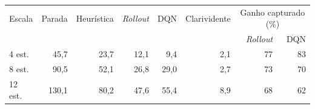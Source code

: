 \begin{tabular}{lrrrrrrr}
\toprule
Escala & Parada & Heur\'istica & \emph{Rollout} & DQN & Clarividente & \multicolumn{2}{c}{Ganho capturado (\%)} \\
\cmidrule(lr){7-8}
 & & & & & & \emph{Rollout} & DQN \\
\midrule
4 est. & 45,7 & 23,7 & 12,1 & 9,4 & 2,1 & 77 & 83 \\
8 est. & 90,5 & 52,1 & 26,8 & 29,0 & 2,7 & 73 & 70 \\
12 est. & 130,1 & 80,2 & 47,6 & 55,4 & 8,9 & 68 & 62 \\
\bottomrule
\end{tabular}

